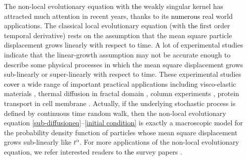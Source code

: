 \documentclass[11pt]{article}%
\numberwithin{equation}{section}
\begin{document}

The non-local evolutionary equation with \textcolor{black}{the} weakly singular kernel has attracted much attention in recent years, thanks to its \textcolor{black}{numerous} real world applications. The classical local evolutionary equation (with \textcolor{black}{the} first order temporal derivative) rests on the assumption that the mean square particle displacement grows linearly with respect to time. A lot of experimental studies indicate that the linear-growth assumption may not be accurate enough to describe some physical processes in which the mean square displacement grows sub-linearly or super-linearly with respect to time. These experimental studies \textcolor{black}{cover} a wide range of important practical applications including  visco-elastic materials \cite{caputo1966Linear,eidulman2004},  thermal diffusion in fractal domain \cite{nigmatullin2010the}, column experiments \cite{hatano1998}, protein transport in cell membrane \cite{kou2008}.
Actually, if the underlying stochastic process is defined by continuous time random walk, then the non-local evolutionary equation \eqref{sub-diffusioneq}--\eqref{initial condition} is exactly a macroscopic model for the probability density function of particles whose mean square displacement grows sub-linearly like $t^{\alpha}$. For more applications of the non-local evolutionary equation, we refer interested readers to \textcolor{black}{the} survey papers \cite{2019Numerical,sun2018213,metzler2014anomalous,metzler2000random}.
\end{document}
